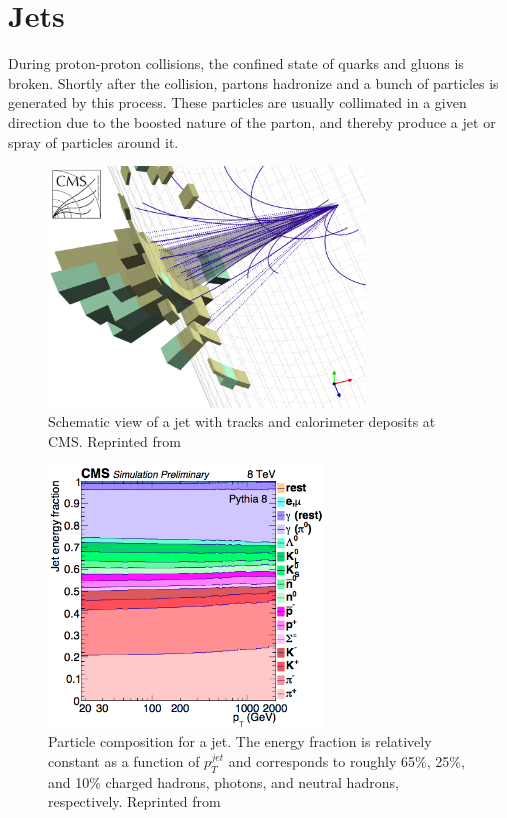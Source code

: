 \section{Jets\label{sec:jets}}

During proton-proton collisions, the confined state of quarks and gluons is broken. Shortly after the collision, partons hadronize and a bunch of particles is generated by this process. These particles are usually collimated in a given direction due to the boosted nature of the parton, and thereby produce a jet or spray of particles around it.

\begin{figure}[h]
 	\centering
 	\includegraphics[width=0.75\textwidth]{figures/cmsjet.png}
 	\singlespace
 	\caption{Schematic view of a jet with tracks and calorimeter deposits at CMS. Reprinted from \cite{jetCMS}}
  	\label{fig:jets2} 	
 \end{figure}

\begin{figure}[h]
 	\centering
 	\includegraphics[width=0.65\textwidth]{figures/jme.png}
 	\singlespace
 	\caption{Particle composition for a jet. The energy fraction is relatively constant as a function of $p_{T}^{jet}$ and corresponds to roughly 65$\%$, 25$\%$, and 10$\%$ charged hadrons, photons, and neutral hadrons, respectively. Reprinted from \cite{Cacciari:2008gp}}
  	\label{fig:jme} 	
 \end{figure}

